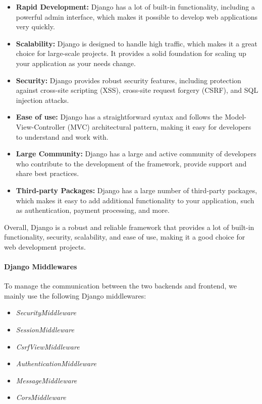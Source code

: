 \documentclass[table, 12pt]{article}
\begin{document}
\begin{itemize}
\item \textbf{Rapid Development:} Django has a lot of built-in functionality, including a powerful admin interface, which makes it possible to develop web applications very quickly.

\item \textbf{Scalability:} Django is designed to handle high traffic, which makes it a great choice for large-scale projects. It provides a solid foundation for scaling up your application as your needs change.

\item \textbf{Security:} Django provides robust security features, including protection against cross-site scripting (XSS), cross-site request forgery (CSRF), and SQL injection attacks.

\item \textbf{Ease of use:} Django has a straightforward syntax and follows the Model-View-Controller (MVC) architectural pattern, making it easy for developers to understand and work with.

\item \textbf{Large Community:} Django has a large and active community of developers who contribute to the development of the framework, provide support and share best practices.

\item \textbf{Third-party Packages:} Django has a large number of third-party packages, which makes it easy to add additional functionality to your application, such as authentication, payment processing, and more.

\end{itemize}

Overall, Django is a robust and reliable framework that provides a lot of built-in functionality, security, scalability, and ease of use, making it a good choice for web development projects.

\paragraph{Django Middlewares}
To manage the communication between the two backends and frontend, we mainly use the following Django middlewares:
\begin{itemize}
    \item \textit{SecurityMiddleware}
    \item \textit{SessionMiddleware}
    \item \textit{CsrfViewMiddleware}
    \item \textit{AuthenticationMiddleware}
    \item \textit{MessageMiddleware}
    \item \textit{CorsMiddleware}
\end{itemize}
\end{document}
